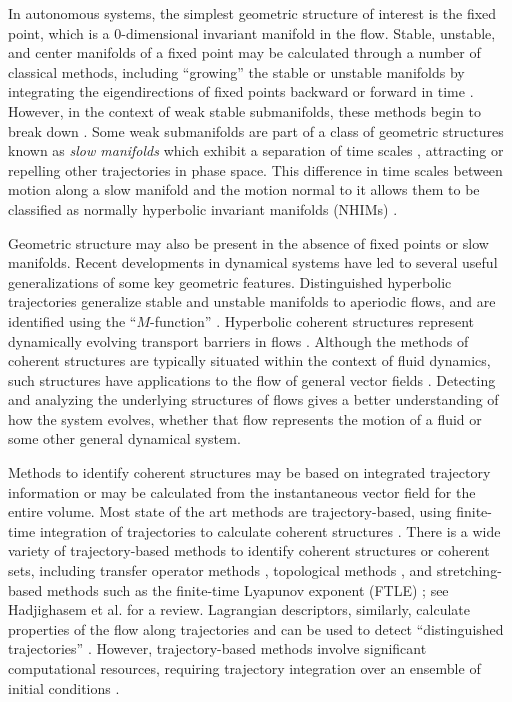 \documentclass[twocolumn]{svjour3}
\newcommand{\edit}[3]{{\color{red} #2}}
\begin{document}
In autonomous systems, the simplest geometric structure of interest is the fixed point, which is a 0-dimensional invariant manifold in the flow. Stable, unstable, and center manifolds of a fixed point may be calculated through a number of classical methods, including ``growing'' the stable or unstable manifolds by integrating the eigendirections of fixed points backward or forward in time \cite{koon2008dynamical}. However, in the context of weak stable submanifolds, these methods begin to break down \cite{nave2018global}. Some weak submanifolds are part of a class of geometric structures known as \textit{slow manifolds} which exhibit a separation of time scales \cite{kuehn2016multiple}, attracting or repelling other trajectories in phase space. This difference in time scales between motion along a slow manifold and the motion normal to it allows them to be classified as normally hyperbolic invariant manifolds (NHIMs) \cite{wiggins2013normally}.

Geometric structure may also be present in the absence of fixed points or slow manifolds. Recent developments in dynamical systems have led to several useful generalizations of some key geometric features. Distinguished hyperbolic trajectories generalize stable and unstable manifolds to aperiodic flows, and are identified using the ``$M$-function'' \cite{madrid2009distinguished}. Hyperbolic coherent structures represent dynamically evolving transport barriers in flows \cite{shadden2011lagrangian,shadden2005definition}. Although the methods of coherent structures are typically situated within the context of fluid dynamics, such structures have applications to the flow of general vector fields \cite{aldridge2006direct,gawlik2009lagrangian,nave2018global,tanaka2010mathematical}. Detecting and analyzing the underlying structures of flows gives a better understanding of how the system evolves, whether that flow represents the motion of a fluid or some other general dynamical system.

Methods to identify coherent structures may be based on integrated trajectory information or may be calculated from the instantaneous vector field for the entire volume. Most state of the art methods are trajectory-based, using finite-time integration of trajectories to calculate coherent structures \cite{balasuriya2018generalized,shadden2011lagrangian}. There is a wide variety of trajectory-based methods to identify coherent structures or coherent sets, including transfer operator methods \cite{dellnitz2001algorithms,froyland2015rough}, topological methods \cite{allshouse2012detecting,budivsic2015finite}, and stretching-based methods such as the finite-time Lyapunov exponent (FTLE) \cite{shadden2005definition}; see Hadjighasem et al. \cite{hadjighasem2017critical} for a review. 
\edit{}{Lagrangian descriptors, similarly, calculate properties of the flow along trajectories and can be used to detect ``distinguished trajectories'' \cite{lopesino2017theoretical,madrid2009distinguished}.}{} However, trajectory-based methods involve significant computational resources, requiring trajectory integration over an ensemble of initial conditions \cite{ameli2014development,brunton2010fast}.
\end{document}
